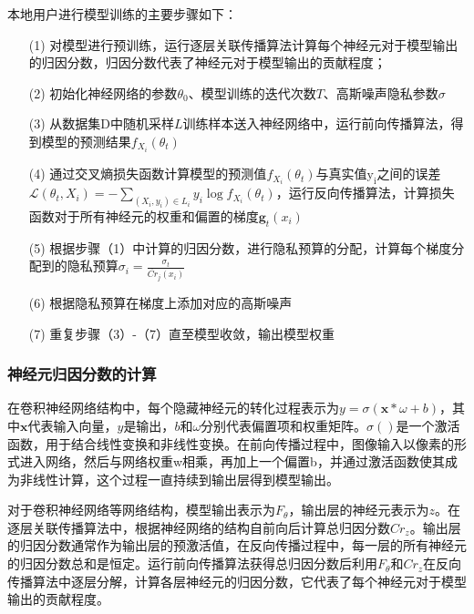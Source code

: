 本地用户进行模型训练的主要步骤如下：
\begin{enumerate}
\item [(1)] 对模型进行预训练，运行逐层关联传播算法计算每个神经元对于模型输出的归因分数，归因分数代表了神经元对于模型输出的贡献程度；
\item [(2)] 初始化神经网络的参数$\theta_{0}$、模型训练的迭代次数$T$、高斯噪声隐私参数$\sigma$
\item [(3)] 从数据集D中随机采样$L$训练样本送入神经网络中，运行前向传播算法，得到模型的预测结果$f_{X_{i}}\left(\theta_{t}\right)$
\item [(4)] 通过交叉熵损失函数计算模型的预测值$f_{X_{i}}\left(\theta_{t}\right)$与真实值$\mathrm{y}_{\mathrm{i}}$之间的误差$\mathcal{L}\left(\theta_{t}, X_{i}\right)=-\sum_{\left(X_{i}, y_{i}\right) \in L_{i}} y_{i} \log f_{X_{i}}\left(\theta_{t}\right)$，运行反向传播算法，计算损失函数对于所有神经元的权重和偏置的梯度$\mathbf{g}_{t}\left(x_{i}\right)$
\item [(5)] 根据步骤（1）中计算的归因分数，进行隐私预算的分配，计算每个梯度分配到的隐私预算$\sigma_{i}=\frac{\sigma_{t}}{\ddot{Cr_{j}}\left(x_{i}\right)}$
\item [(6)] 根据隐私预算在梯度上添加对应的高斯噪声
\item [(7)] 重复步骤（3）-（7）直至模型收敛，输出模型权重
\end{enumerate}

\subsubsection{神经元归因分数的计算}
在卷积神经网络结构中，每个隐藏神经元的转化过程表示为$y=\sigma(\mathbf{x} * \omega+b)$，其中$\mathbf{x}$代表输入向量，$y$是输出，$b$和$\omega$分别代表{}偏置项和权重矩阵。$\sigma()$是一个激活函数，用于结合线性变换和非线性变换。在前向传播过程中，图像输入以像素的形式进入网络，然后与网络权重w相乘，再加上一个偏置b，并通过激活函数使其成为非线性计算，这个过程一直持续到输出层得到模型输出。

对于卷积神经网络等网络结构，模型输出表示为$F_{\theta}$，输出层的神经元表示为$z$。在逐层关联传播算法中，根据神经网络的结构自前向后计算总归因分数$Cr_{z}$。输出层的归因分数通常作为输出层的预激活值，在反向传播过程中，每一层的所有神经元的归因分数总和是恒定。运行前向传播算法获得总归因分数后利用$F_{\theta}$和$Cr_{z}$在反向传播算法中逐层分解，计算各层神经元的归因分数，它代表了每个神经元对于模型输出的贡献程度。

